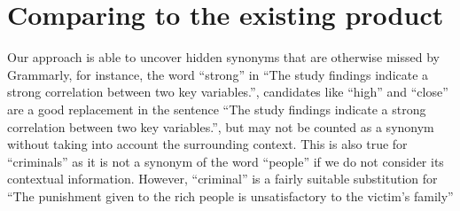 \documentclass[12pt,oneside,openright,a4paper]{cpe-english-project}
\begin{document}
\section{Comparing to the existing product}
Our approach is able to uncover hidden synonyms that are otherwise missed by Grammarly, for instance, the word “strong” in “The study findings indicate a strong correlation between two key variables.”, candidates like “high” and “close” are a good replacement in the sentence “The study findings indicate a strong correlation between two key variables.”, but may not be counted as a synonym without taking into account the surrounding context. This is also true for “criminals” as it is not a synonym of the word “people” if we do not consider its contextual information. However, “criminal” is a fairly suitable substitution for “The punishment given to the rich people is unsatisfactory to the victim's family”

\end{document}
